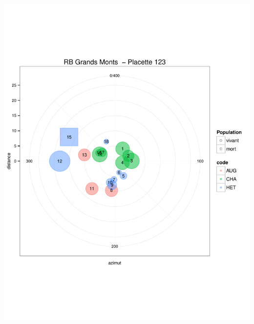 \documentclass[a4paper]{book}\usepackage[]{graphicx}\usepackage[]{color}
\makeatletter
\def\maxwidth{ %
  \ifdim\Gin@nat@width>\linewidth
    \linewidth
  \else
    \Gin@nat@width
  \fi
}
\newenvironment{knitrout}{}{} %
\makeatother
\begin{document}
\begin{knitrout}
{\centering \includegraphics[width=\maxwidth]{Figures/PlanArbres-5} 

}





\end{knitrout}
\end{document}
